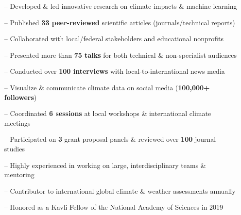 \documentclass[10pt,letterpaper]{altacv} %
\begin{document}

%

\begin{fullwidth}
\makecvheader
\end{fullwidth}

%

\vspace{-0.09in}
\begin{itemize}
    \setlength{\itemindent}{0.5em}
    \item[--] \small{Developed \& led innovative research on climate impacts \& machine learning}
    \item[--] \small{Published \textbf{33 peer-reviewed} scientific articles (journals/technical reports)}
    \item[--] \small{Collaborated with local\slash federal stakeholders and educational nonprofits}
    \item[--] \small{Presented more than \textbf{75 talks} for both technical \& non-specialist audiences}
    \item[--] \small{Conducted over \textbf{100 interviews} with local-to-international news media}
    \item[--] \small{Visualize \& communicate climate data on social media (\textbf{100,000+ followers})}
    \item[--] \small{Coordinated \textbf{6 sessions} at local workshops \& international climate meetings}
    \item[--] \small{Participated on \textbf{3} grant proposal panels \& reviewed over \textbf{100} journal studies}
    \item[--] \small{Highly experienced in working on large, interdisciplinary teams \& mentoring}
    \item[--] \small{Contributor to international global climate \& weather assessments annually}
    \item[--] \small{Honored as a Kavli Fellow of the National Academy of Sciences in 2019}
\end{itemize}
\smallskip
\end{document}
